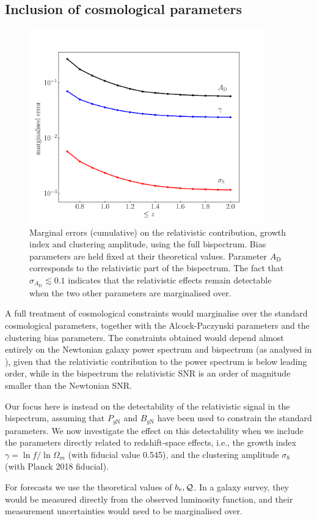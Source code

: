 \subsection{Inclusion of cosmological parameters}
\begin{figure}[!ht]
\centering
\includegraphics[width=0.9\textwidth]{fig/gamma_sigma8_AD-eps-converted-to}
\caption{Marginal errors (cumulative) on the relativistic contribution, growth index and clustering amplitude, using the full bispectrum. Bias parameters are held fixed at their theoretical values. Parameter $A_\mathrm{D}$ corresponds to the relativistic part of the bispectrum. The fact that  $\sigma_{A_{\mathrm{D}}}\lesssim 0.1$ indicates that the relativistic effects remain detectable when the two other parameters are marginalised over.} \label{sig}
\end{figure}
{A full treatment of cosmological constraints would marginalise over the standard cosmological parameters, together with the Alcock-Paczynski parameters and the clustering bias parameters. The constraints obtained would depend almost entirely on the Newtonian galaxy power spectrum and bispectrum (as analysed in \cite{Yankelevich:2018uaz}), given that the relativistic contribution to the power spectrum is below leading order, while in the bispectrum the relativistic SNR is  an order of magnitude smaller than the Newtonian SNR. 

Our focus here is instead on the detectability of the relativistic signal in the bispectrum, {assuming that $P_{g\mathrm{N}}$ and $B_{g\mathrm{N}}$ have been used to constrain the standard parameters.}
We now investigate the effect on this detectability when we include the parameters directly related to redshift-space effects, i.e.,  the growth index $\gamma=\ln f/ \ln\Omega_m$ (with fiducial value 0.545), and the clustering amplitude $\sigma_8$ (with Planck 2018 fiducial).} 
For forecasts we use the theoretical values of $b_e, \mathcal{Q}$. In a galaxy survey, they would be measured directly from the observed luminosity function, and their measurement uncertainties would need to be marginalised over.


